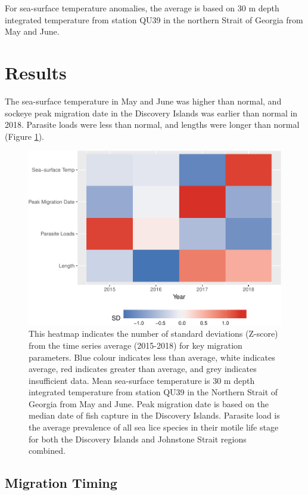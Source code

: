 \documentclass[fleqn,10pt]{wlpeerj} %
\begin{document}
For sea-surface temperature anomalies, the average is based on 30 m
depth integrated temperature from station QU39 in the northern Strait of
Georgia from May and June.

\section*{Results}\label{results}

The sea-surface temperature in May and June was higher than normal, and
sockeye peak migration date in the Discovery Islands was earlier than
normal in 2018. Parasite loads were less than normal, and lengths were
longer than normal (Figure \ref{fig:heatmap}).

\begin{figure}
\includegraphics[width=0.8\linewidth]{peer_j_migration_dynamics_files/figure-latex/heatmap-1} \caption{This heatmap indicates the number of standard deviations (Z-score) from the time series average (2015-2018) for key migration parameters. Blue colour indicates less than average, white indicates average, red indicates greater than average, and grey indicates insufficient data. Mean sea-surface temperature is 30 m depth integrated temperature from station QU39 in the Northern Strait of Georgia from May and June. Peak migration date is based on the median date of fish capture in the Discovery Islands. Parasite load is the average prevalence of all sea lice species in their motile life stage for both the Discovery Islands and Johnstone Strait regions combined.}\label{fig:heatmap}
\end{figure}

\subsection*{Migration Timing}\label{migration-timing}
\end{document}
